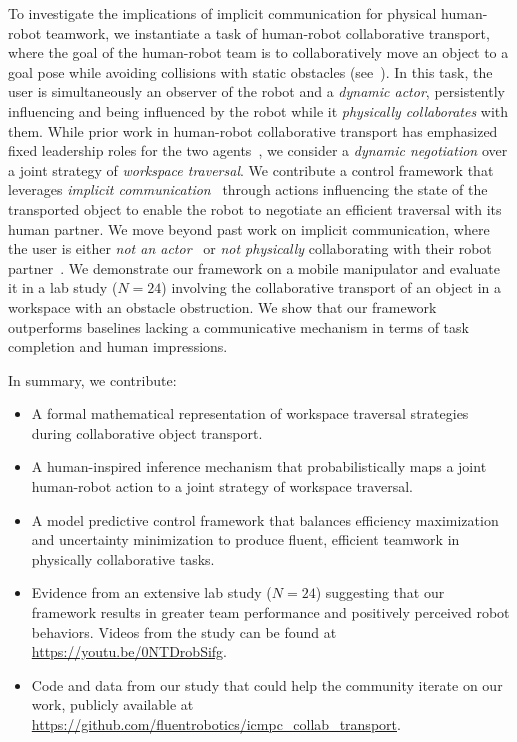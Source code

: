To investigate the implications of implicit communication for physical human-robot teamwork, we instantiate a task of human-robot collaborative transport, where the goal of the human-robot team is to collaboratively move an object to a goal pose while avoiding collisions with static obstacles (see~).
In this task, the user is simultaneously an observer of the robot and a \emph{dynamic actor}, persistently influencing and being influenced by the robot while it \emph{physically collaborates} with them.
While prior work in human-robot collaborative transport has emphasized fixed leadership roles for the two agents~\citep{bussy2012transportation,bussy2012proactive,mielke2024comanipulation,lima2023assistive,solanes2018human,nikolaidis2017mutual}, we consider a \emph{dynamic negotiation} over a joint strategy of \emph{workspace traversal}.
We contribute a control framework that leverages \emph{implicit communication}~\citep{knepper2017implicit} through actions influencing the state of the transported object to enable the robot to negotiate an efficient traversal with its human partner. We move beyond past work on implicit communication, where the user is either \emph{not an actor}~\citep{DraganAuR14} or \emph{not physically} collaborating with their robot partner~\citep{mavrogiannis2022socialmomentum,liang2019implicit}.
We demonstrate our framework on a mobile manipulator and evaluate it in a lab study ($N=24$) involving the collaborative transport of an object in a workspace with an obstacle obstruction. We show that our framework outperforms baselines lacking a communicative mechanism in terms of task completion and human impressions.

In summary, we contribute:
\begin{itemize}
  \item A formal mathematical representation of workspace traversal strategies during collaborative object transport.
  \item A human-inspired inference mechanism that probabilistically maps a joint human-robot action to a joint strategy of workspace traversal.
  \item A model predictive control framework that balances efficiency maximization and uncertainty minimization to produce fluent, efficient teamwork in physically collaborative tasks.
  \item Evidence from an extensive lab study ($N=24$) suggesting that our framework results in greater team performance and positively perceived robot behaviors. Videos from the study can be found at \url{https://youtu.be/0NTDrobSifg}.
  \item Code and data from our study that could help the community iterate on our work, publicly available at \url{https://github.com/fluentrobotics/icmpc\_collab\_transport}.
\end{itemize}
